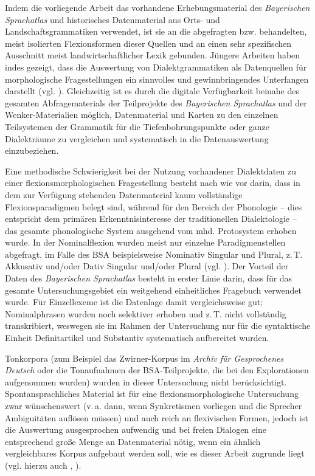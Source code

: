 Indem die vorliegende Arbeit das vorhandene Erhebungsmaterial des \textit{Bayerischen Sprachatlas} und historisches Datenmaterial aus Orts- und Landschaftsgrammatiken verwendet, ist sie an die abgefragten bzw. behandelten, meist isolierten Flexionsformen dieser Quellen und an einen sehr spezifischen Ausschnitt meist landwirtschaftlicher Lexik gebunden. Jüngere Arbeiten haben indes gezeigt, dass die Auswertung von Dialektgrammatiken als Datenquellen für morphologische Fragestellungen ein sinnvolles und gewinnbringendes Unterfangen darstellt (vgl. \citealt{Birkenes2014, Fischer2018, Fischer2019}). Gleichzeitig ist es durch die digitale Verfügbarkeit beinahe des gesamten Abfragematerials der Teilprojekte des \textit{Bayerischen Sprachatlas} und der Wenker-Materialien möglich, Datenmaterial und Karten zu den einzelnen Teilsystemen der Grammatik für die Tiefenbohrungspunkte oder ganze Dialekträume zu vergleichen und systematisch in die Datenauswertung einzubeziehen.

Eine methodische Schwierigkeit bei der Nutzung vorhandener Dialektdaten zu einer flexionsmorphologischen Fragestellung besteht nach wie vor darin, dass in dem zur Verfügung stehenden Datenmaterial kaum vollständige Flexionsparadigmen belegt sind, während für den Bereich der Phonologie -- dies entspricht dem primären Erkenntnisinteresse der traditionellen Dialektologie -- das gesamte phonologische System ausgehend vom mhd. Protosystem erhoben wurde. In der Nominalflexion wurden meist nur einzelne Paradigmenstellen abgefragt, im Falle des BSA beispielsweise Nominativ Singular und Plural, z.\,T. Akkusativ \mbox{und}\slash oder Dativ Singular und\slash oder Plural (vgl. \citealt[814]{Rabanus2010}). Der Vorteil der Daten des \textit{Bayerischen Sprachatlas} besteht in erster Linie darin, dass für das gesamte Untersuchungsgebiet ein weitgehend einheitliches Fragebuch verwendet wurde. Für Einzellexeme ist die Datenlage damit vergleichsweise gut; Nominalphrasen wurden noch selektiver erhoben und z.\,T. nicht vollständig transkribiert, weswegen sie im Rahmen der Untersuchung nur für die syntaktische Einheit Definitartikel und Substantiv systematisch aufbereitet wurden.

Tonkorpora (zum Beispiel das Zwirner-Korpus im \textit{Archiv für Gesprochenes Deutsch} oder die Tonaufnahmen der BSA-Teilprojekte, die bei den Explorationen aufgenommen wurden) wurden in dieser Untersuchung nicht berücksichtigt. Spontansprachliches Material ist für eine flexionsmorphologische Untersuchung zwar wünschenswert (v.\,a. dann, wenn Synkretismen vorliegen und die Sprecher Ambiguitäten auflösen müssen) und auch reich an flexivischen Formen, jedoch ist die Auswertung ausgesprochen aufwendig und bei freien Dialogen eine entsprechend große Menge an Datenmaterial nötig, wenn ein ähnlich vergleichbares Korpus aufgebaut werden soll, wie es dieser Arbeit zugrunde liegt (vgl. hierzu auch \citealt[37]{Birkenes2014}, \citealt[39]{SchmidtEtAl2019}).

